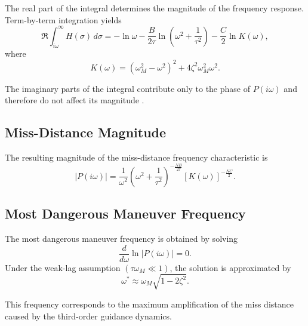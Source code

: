 \documentclass[11pt,a4paper]{article}
\begin{document}
The real part of the integral determines the magnitude of the frequency response. Term-by-term integration yields
\begin{equation}
\Re\!\int_{i\omega}^{\infty} H(\sigma)\,d\sigma
=
-\ln\omega
-\frac{B}{2\tau}\ln\!\left(\omega^2+\frac{1}{\tau^2}\right)
-\frac{C}{2}\ln K(\omega),
\end{equation}
where
\begin{equation}
K(\omega)=
(\omega_M^2-\omega^2)^2
+4\zeta^2\omega_M^2\omega^2 .
\end{equation}

The imaginary parts of the integral contribute only to the phase of $P(i\omega)$ and therefore do not affect its magnitude \cite{Yanushevsky2004}.

\subsection{Miss-Distance Magnitude}

The resulting magnitude of the miss-distance frequency characteristic is
\begin{equation}
|P(i\omega)|
=
\frac{1}{\omega^2}
\left(\omega^2+\frac{1}{\tau^2}\right)^{-\frac{NB}{2\tau}}
\left[K(\omega)\right]^{-\frac{NC}{2}}.
\end{equation}

\subsection{Most Dangerous Maneuver Frequency}

The most dangerous maneuver frequency is obtained by solving
\begin{equation}
\frac{d}{d\omega}\ln|P(i\omega)| = 0.
\end{equation}
Under the weak-lag assumption $(\tau\omega_M \ll 1)$, the solution is approximated by
\begin{equation}
\omega^* \approx \omega_M\sqrt{1-2\zeta^2}.
\end{equation}

This frequency corresponds to the maximum amplification of the miss distance caused by the third-order guidance dynamics.


\end{document}
